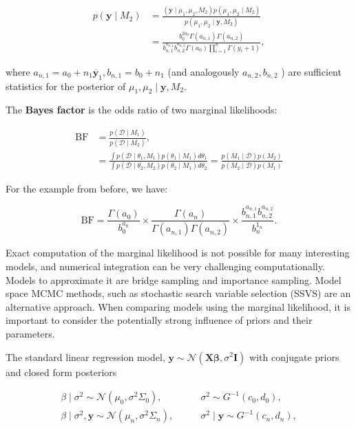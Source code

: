 \begin{align*}
p\left(\bm{y} \mid M_2\right) & =\frac{\left(\bm{y} \mid \mu_1, \mu_2, M_2\right) p\left(\mu_1, \mu_2 \mid M_2\right)}{p\left(\mu_1, \mu_2 \mid \bm{y}, M_2\right)} \\
& =\frac{b_0^{2 a_0} \Gamma\left(a_{n, 1}\right) \Gamma\left(a_{n, 2}\right)}{b_{n, 1}^{a_{n, 1}} b_{n, 2}^{a_{n, 2}} \Gamma\left(a_0\right) \prod_{i=1}^n \Gamma\left(y_i+1\right)},
\end{align*}

where $a_{n, 1}=a_0+n_1 \overline{\bm{y}}_1, b_{n, 1}=b_0+n_1$ (and analogously $a_{n, 2}, b_{n, 2}$ ) are sufficient statistics for the posterior of $\mu_1, \mu_2 \mid \bm{y}, M_2$.

The \textbf{Bayes factor} is the odds ratio of two marginal likelihoods:

\begin{align*}
\mathrm{BF} & =\frac{p\left(\mathcal{D} \mid M_1\right)}{p\left(\mathcal{D} \mid M_2\right)}, \\
& =\frac{\int p\left(\mathcal{D} \mid \theta_1, M_1\right) p\left(\theta_1 \mid M_1\right) d \theta_1}{\int p\left(\mathcal{D} \mid \theta_2, M_2\right) p\left(\theta_2 \mid M_1\right) d \theta_2}=\frac{p\left(M_1 \mid \mathcal{D}\right) p\left(M_2\right)}{p\left(M_2 \mid \mathcal{D}\right) p\left(M_1\right)}
\end{align*}

For the example from before, we have:

\[
\mathrm{BF}=\frac{\Gamma\left(a_0\right)}{b_0^{a_0}} \times \frac{\Gamma\left(a_n\right)}{\Gamma\left(a_{n, 1}\right) \Gamma\left(a_{n, 2}\right)} \times \frac{b_{n, 1}^{a_{n, 1}} b_{n, 2}^{a_{n, 2}}}{b_n^{1_n}} .
\]

Exact computation of the marginal likelihood is not possible for many interesting models, and numerical integration can be very challenging computationally. Models to approximate it are bridge sampling and importance sampling. Model space MCMC methods, such as stochastic search variable selection (SSVS) are an alternative approach. When comparing models using the marginal likelihood, it is important to consider the potentially strong influence of priors and their parameters.

The standard linear regression model, $\bm{y} \sim \mathcal{N}(\bm{X\beta},\sigma^2\bm{I})$ with conjugate priors and closed form posteriors 

\begin{align*}
	\beta\mid\sigma^2\sim\mathcal{N}(\mu_0,\sigma^2\Sigma_0), &\qquad\sigma^2\sim G^{-1}(c_0,d_0), \\
	\beta\mid\sigma^2,\bm{y} \sim \mathcal{N}(\mu_n,\sigma^2\Sigma_n), &\qquad \sigma^2\mid\bm{y}\sim G^{-1}(c_n,d_n),
\end{align*}

